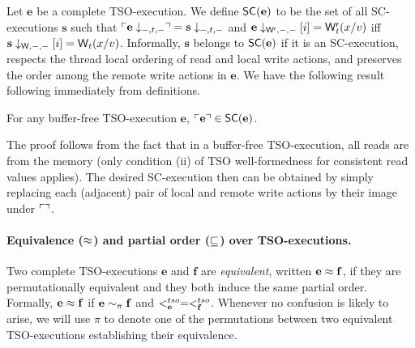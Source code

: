 Let $\mathbf{e}$ be a complete TSO-execution.
We define $\mathsf{SC}(\mathbf{e})$ to be the set of all SC-executions $\mathbf{s}$ such that $\ulcorner \mathbf{e}\downarrow_{-,t,-} \urcorner=\mathbf{s}\downarrow_{-,t,-}$ and $\mathbf{e}\downarrow_{\mathsf{W}^{\mathsf{r}},-,-}[i] = \mathsf{W}^{\mathsf{r}}_{t}(x/v)$ iff $\mathbf{s}\downarrow_{\mathsf{W},-,-}[i] = \mathsf{W}_{t}(x/v)$.
Informally, $\mathbf{s}$ belongs to $\mathsf{SC}(\mathbf{e})$ if it is an SC-execution, respects the thread local ordering of read and local write actions, and preserves the order among the remote write actions in $\mathbf{e}$.
We have the following result following immediately from definitions.



\begin{proposition}\label{prop:complete-tso}
For any buffer-free TSO-execution $\mathbf{e}$, $\ulcorner \mathbf{e} \urcorner \in \mathsf{SC}(\mathbf{e})$.
\end{proposition}
The proof follows from the fact that in a buffer-free TSO-execution, all reads are from the memory (only condition (ii) of TSO well-formedness for consistent read values applies).
The desired SC-execution then can be obtained by simply replacing each (adjacent) pair of local and remote write actions by their image under $\ulcorner \urcorner$.


\paragraph{Equivalence ($\approx$) and partial order ($\sqsubseteq$) over TSO-executions.}
Two complete TSO-executions $\mathbf{e}$ and $\mathbf{f}$ are {\em equivalent}, written $\mathbf{e}\approx\mathbf{f}$, if they are permutationally equivalent and they both induce the same partial order. 
Formally, $\mathbf{e}\approx\mathbf{f}$ if $\mathbf{e}\sim_{\pi}\mathbf{f}$ and $<^{tso}_{\mathbf{e}}=<^{tso}_{\mathbf{f}}$.
Whenever no confusion is likely to arise, we will use $\pi$ to denote one of the permutations between two equivalent TSO-executions establishing their equivalence.

